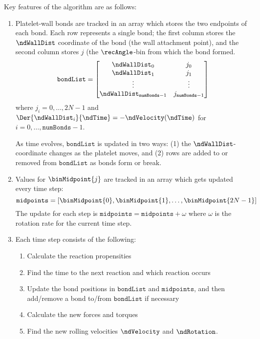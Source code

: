 Key features of the algorithm are as follows:
\begin{enumerate}
\item Platelet-wall bonds are tracked in an array which stores the two
  endpoints of each bond. Each row represents a single bond; the first
  column stores the $\ndWallDist$ coordinate of the bond (the wall
  attachment point), and the second column stores $j$ (the
  $\recAngle$-bin from which the bond formed.
  \begin{equation}
    \label{eq:bond-list}
    \texttt{bondList} =
    \begin{bmatrix}
      \ndWallDist_0 & j_0 \\
      \ndWallDist_1 & j_1 \\
      \vdots & \vdots \\
      \ndWallDist_{\texttt{numBonds}-1} & j_{\texttt{numBonds} - 1}
    \end{bmatrix}    
  \end{equation}
  where $j_i = 0, \hdots, 2N-1$ and
  $\Der{\ndWallDist_i}{\ndTime} = -\ndVelocity(\ndTime)$ for
  $i = 0, \hdots, \texttt{numBonds} - 1$.

  As time evolves, $\texttt{bondList}$ is updated in two ways: (1) the
  $\ndWallDist$-coordinate changes as the platelet moves, and (2) rows
  are added to or removed from $\texttt{bondList}$ as bonds form or
  break.
\item Values for $\binMidpoint{j}$ are tracked in an array which gets
  updated every time step:
  \begin{equation}
    \label{eq:midpt-list}
    \texttt{midpoints} = \left[\binMidpoint{0}, \binMidpoint{1}, \hdots,
      \binMidpoint{2N - 1}]\right.
  \end{equation}
  The update for each step is
  $\texttt{midpoints} = \texttt{midpoints} + \omega$ where $\omega$ is
  the rotation rate for the current time step.
\item Each time step consists of the following:
  \begin{enumerate}
  \item Calculate the reaction propensities
  \item Find the time to the next reaction and which reaction occurs
  \item Update the bond positions in $\texttt{bondList}$ and
    $\texttt{midpoints}$, and then add/remove a bond to/from
    $\texttt{bondList}$ if necessary
  \item Calculate the new forces and torques
  \item Find the new rolling velocities $\ndVelocity$ and $\ndRotation$.
  \end{enumerate}
\end{enumerate}

